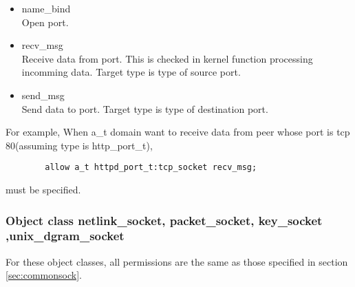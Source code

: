 \documentclass{article}
\begin{document}
\begin{itemize}
       \begin{itemize}
	\item  name\_bind\\
	       Open port.
	\item recv\_msg\\
	       Receive data from port. This is checked in kernel
	       function processing incomming data. Target type is type of source port.
	\item send\_msg\\
	       Send data to port. Target type is type of destination port.
       \end{itemize}       
       For example,
       When a\_t domain want to receive data from peer whose port is tcp 80(assuming type is http\_port\_t),
       \begin{verbatim}
		allow a_t httpd_port_t:tcp_socket recv_msg;
       \end{verbatim}
       must be specified.
\end{itemize}



      


\subsubsection{Object class netlink\_socket, packet\_socket, key\_socket
,unix\_dgram\_socket }
For these object classes, all permissions are the same as those
specified in section \ref{sec:commonsock}.
\end{document}
